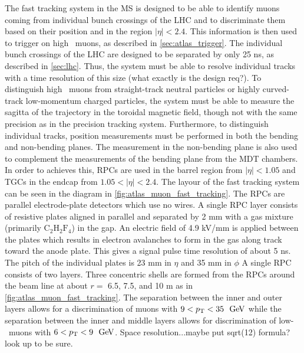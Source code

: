 The fast tracking system in the MS is designed to be able
to identify muons coming from individual bunch crossings of the LHC
and to discriminate them based on their position and \pt in the region
$|\eta|<2.4$. This information
is then used to trigger on high \pt~muons, as 
described in \sec\ref{sec:atlas_trigger}.
The individual bunch crossings of the LHC are designed to 
be separated by only 25 ns, as described in \sec\ref{sec:lhc}.
Thus, the system must be able to resolve individual tracks 
with a time resolution of this size (what exactly is the design req?).
To distinguish high \pt~muons from straight-track neutral particles 
or highly curved-track low-momentum charged particles, the 
system must be able to measure the sagitta of the 
trajectory in the toroidal magnetic field, though not 
with the same precision as in the precision tracking system.
Furthermore, to distinguish individual tracks, position measurements
must be performed in both the bending and non-bending planes.
The measurement in the non-bending plane is also used to complement
the measurements of the bending plane from the MDT chambers.
In order to achieves this, RPCs are used in the barrel region
from $|\eta|<1.05$ and TGCs in the endcap from $1.05 < |\eta|<2.4$.
The layour of the fast tracking system can be seen in the diagram
in \fig\ref{fig:atlas_muon_fast_tracking}. %
The RPCs are parallel electrode-plate detectors which use no wires.
A single RPC layer consists of 
resistive plates aligned in parallel and separated by 2 mm 
with a gas mixture (primarily $\textrm{C}_2\textrm{H}_2\textrm{F}_4$)
in the gap. An electric field of 4.9 kV/mm is applied between 
the plates which results in electron avalanches to form in the gas
along track toward the anode plate.
This gives a signal pulse time resolution of about 5 ns.
The pitch of the individual plates is 23 mm in $\eta$ and 35 mm in $\phi$
A single RPC consists of two layers.  Three concentric shells 
are formed from the RPCs around the beam line at about $r = $ 6.5, 7.5, and 10 m
as in \fig\ref{fig:atlas_muon_fast_tracking}.
The separation between the inner and outer layers 
allows for a discrimination of muons with $9 < \pt < 35~\GeV$
while the separation between the inner and middle layers allows for 
discrimination of low-\pt~muons with $6 < \pt < 9~\GeV$.
Space resolution...maybe put sqrt(12) formula? look up to be sure.



